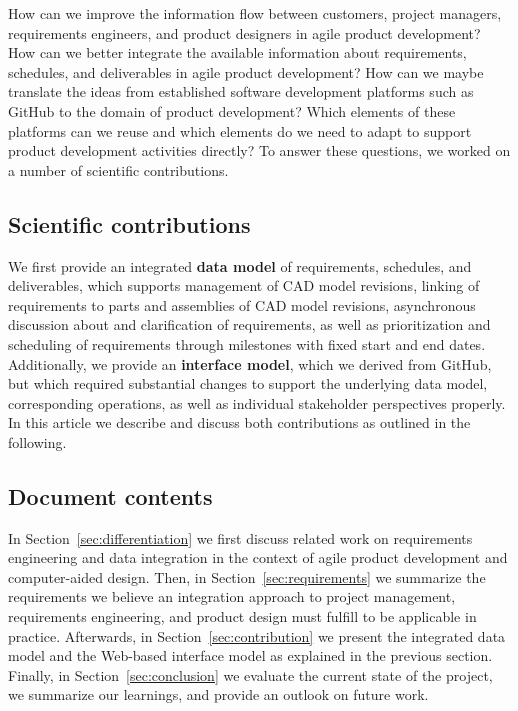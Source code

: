 How can we improve the information flow between customers, project managers, requirements engineers, and product designers in agile product development?
How can we better integrate the available information about requirements, schedules, and deliverables in agile product development?
How can we maybe translate the ideas from established software development platforms such as GitHub to the domain of product development?
Which elements of these platforms can we reuse and which elements do we need to adapt to support product development activities directly?
To answer these questions, we worked on a number of scientific contributions.

\subsection{Scientific contributions}

We first provide an integrated \textbf{data model} of requirements, schedules, and deliverables, which supports management of CAD model revisions, linking of requirements to parts and assemblies of CAD model revisions, asynchronous discussion about and clarification of requirements, as well as prioritization and scheduling of requirements through milestones with fixed start and end dates.
Additionally, we provide an \textbf{interface model}, which we derived from GitHub, but which required substantial changes to support the underlying data model, corresponding operations, as well as individual stakeholder perspectives properly.
In this article we describe and discuss both contributions as outlined in the following.

\subsection{Document contents}

In Section~\ref{sec:differentiation} we first discuss related work on requirements engineering and data integration in the context of agile product development and computer-aided design.
Then, in Section~\ref{sec:requirements} we summarize the requirements we believe an integration approach to project management, requirements engineering, and product design must fulfill to be applicable in practice.
Afterwards, in Section~\ref{sec:contribution} we present the integrated data model and the Web-based interface model as explained in the previous section.
Finally, in Section~\ref{sec:conclusion} we evaluate the current state of the project, we summarize our learnings, and provide an outlook on future work.
